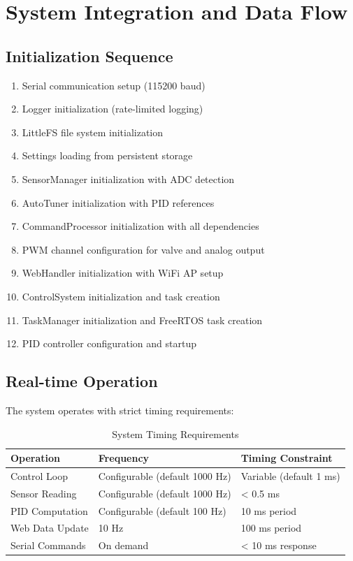 
\section{System Integration and Data Flow}

\subsection{Initialization Sequence}
\begin{enumerate}
    \item Serial communication setup (115200 baud)
    \item Logger initialization (rate-limited logging)
    \item LittleFS file system initialization
    \item Settings loading from persistent storage
    \item SensorManager initialization with ADC detection
    \item AutoTuner initialization with PID references
    \item CommandProcessor initialization with all dependencies
    \item PWM channel configuration for valve and analog output
    \item WebHandler initialization with WiFi AP setup
    \item ControlSystem initialization and task creation
    \item TaskManager initialization and FreeRTOS task creation
    \item PID controller configuration and startup
\end{enumerate}

\subsection{Real-time Operation}
The system operates with strict timing requirements:

\begin{table}[H]
\centering
\begin{tabular}{@{}lll@{}}
\toprule
\textbf{Operation} & \textbf{Frequency} & \textbf{Timing Constraint} \\
\midrule
Control Loop & Configurable (default 1000 Hz) & Variable (default 1 ms) \\
Sensor Reading & Configurable (default 1000 Hz) & < 0.5 ms \\
PID Computation & Configurable (default 100 Hz) & 10 ms period \\
Web Data Update & 10 Hz & 100 ms period \\
Serial Commands & On demand & < 10 ms response \\
\bottomrule
\end{tabular}
\caption{System Timing Requirements}
\end{table}

